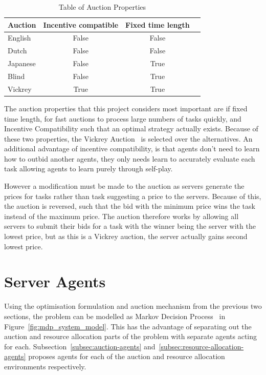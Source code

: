 \begin{table}[h]
    \centering
    \begin{tabular}{|l|c|c|c|} \hline
        \textbf{Auction}  & \textbf{Incentive compatible} & \textbf{Fixed time length} \\ \hline
        English           & False                         & False            \\ \hline
        Dutch             & False                         & False            \\ \hline
        Japanese          & False                         & True             \\ \hline
        Blind             & False                         & True             \\ \hline
        Vickrey           & True                          & True             \\ \hline
    \end{tabular}
    \caption{Table of Auction Properties}
    \label{tab:auction_properties}
\end{table}

The auction properties that this project considers most important are if fixed time length, for fast auctions to
process large numbers of tasks quickly, and Incentive Compatibility such that an optimal strategy actually exists.
Because of these two properties, the Vickrey Auction~\citep{vickrey} is selected over the alternatives. An additional
advantage of incentive compatibility, is that agents don't need to learn how to outbid another agents, they only needs
learn to accurately evaluate each task allowing agents to learn purely through self-play.

However a modification must be made to the auction as servers generate the prices for tasks rather than task
suggesting a price to the servers. Because of this, the auction is reversed, such that the bid with the minimum price
wins the task instead of the maximum price. The auction therefore works by allowing all servers to submit their bids for
a task with the winner being the server with the lowest price, but as this is a Vickrey auction, the server actually
gains second lowest price.

\section{Server Agents}
\label{sec:server-agents}
Using the optimisation formulation and auction mechanism from the previous two sections, the problem can be modelled as
Markov Decision Process~\citep{Bel} in Figure~\ref{fig:mdp_system_model}. This has the advantage of separating out the
auction and resource allocation parts of the problem with separate agents acting for each.
Subsection~\ref{subsec:auction-agents} and~\ref{subsec:resource-allocation-agents} proposes agents
for each of the auction and resource allocation environments respectively.

